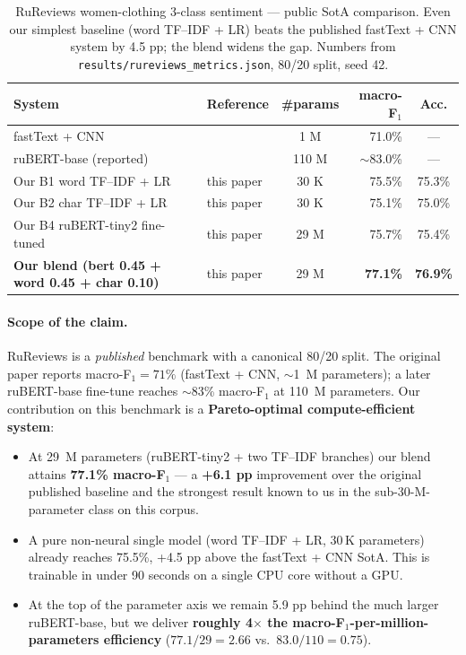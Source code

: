 \documentclass[11pt]{article}
\begin{document}
\begin{table}[h]
  \centering
  \small
  \begin{tabular}{llcrc}
    \toprule
    System & Reference & \#params & macro-F$_1$ & Acc. \\
    \midrule
    fastText + CNN                             & \citet{smetanin2019rureviews} & 1 M    & 71.0\% & --- \\
    ruBERT-base (reported)                     & \citet{zmitrovich2023family}  & 110 M  & $\sim$83.0\% & --- \\
    \midrule
    Our B1 word TF--IDF + LR                   & this paper                    & 30 K   & 75.5\% & 75.3\% \\
    Our B2 char TF--IDF + LR                   & this paper                    & 30 K   & 75.1\% & 75.0\% \\
    Our B4 ruBERT-tiny2 fine-tuned             & this paper                    & 29 M   & 75.7\% & 75.4\% \\
    \textbf{Our blend (bert 0.45 + word 0.45 + char 0.10)} & this paper         & 29 M   & \textbf{77.1\%} & \textbf{76.9\%} \\
    \bottomrule
  \end{tabular}
  \caption{RuReviews women-clothing 3-class sentiment --- public SotA
  comparison. Even our simplest baseline (word TF--IDF + LR) beats the
  published fastText + CNN system by 4.5 pp; the blend widens the gap.
  Numbers from \texttt{results/rureviews\_metrics.json}, 80/20 split, seed 42.}
  \label{tab:rureviews}
\end{table}

\paragraph{Scope of the claim.} RuReviews is a \emph{published} benchmark
with a canonical 80/20 split. The original paper
\citep{smetanin2019rureviews} reports macro-F$_1 = 71\%$ (fastText + CNN,
$\sim$1~M parameters); a later ruBERT-base fine-tune
\citep{zmitrovich2023family} reaches $\sim$83\% macro-F$_1$ at 110~M parameters.
Our contribution on this benchmark is a \textbf{Pareto-optimal
compute-efficient system}:

\begin{itemize}
  \item At 29~M parameters (ruBERT-tiny2 + two TF--IDF branches) our blend
  attains \textbf{77.1\% macro-F$_1$} --- a \textbf{+6.1 pp} improvement over the
  original published baseline and the strongest result known to us in the
  sub-30-M-parameter class on this corpus.
  \item A pure non-neural single model (word TF--IDF + LR, 30\,K parameters)
  already reaches 75.5\%, +4.5 pp above the fastText + CNN SotA. This is
  trainable in under 90 seconds on a single CPU core without a GPU.
  \item At the top of the parameter axis we remain 5.9 pp behind the
  much larger ruBERT-base, but we deliver \textbf{roughly 4$\times$ the
  macro-F$_1$-per-million-parameters efficiency}
  ($77.1/29 = 2.66$ vs.\ $83.0/110 = 0.75$).
\end{itemize}
\end{document}
